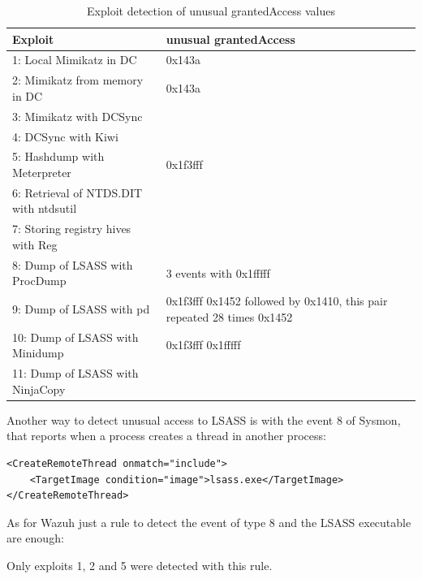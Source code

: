 \begin{table}[H]
	\begin{tabularx}{\textwidth}{|l|X|}
		\hline
		\rowcolor{gray!30}
		Exploit & unusual grantedAccess\\ \hline
		1: Local Mimikatz in DC& \cellcolor{green!60}0x143a\\ \hline
		2: Mimikatz from memory in DC& \cellcolor{green!60} 0x143a\\ \hline
		3: Mimikatz with DCSync& \cellcolor{red!60}\\ \hline
		4: DCSync with Kiwi& \cellcolor{red!60}\\ \hline
		5: Hashdump with Meterpreter& \cellcolor{green!60}0x1f3fff\\ \hline
		6: Retrieval of NTDS.DIT with ntdsutil& \cellcolor{red!60}\\ \hline
		7: Storing registry hives with Reg& \cellcolor{red!60}\\ \hline
		8: Dump of LSASS with ProcDump& \cellcolor{green!60}3 events with 0x1fffff\\ \hline
		9: Dump of LSASS with pd& \cellcolor{green!60}
			0x1f3fff \linej
			0x1452 followed by 0x1410, this pair repeated 28 times \linej
			0x1452 \\ \hline
		10: Dump of LSASS with Minidump& \cellcolor{green!60}
			0x1f3fff \linej
			0x1fffff \\ \hline
		11: Dump of LSASS with NinjaCopy& \cellcolor{red!60}\\ \hline
	\end{tabularx}
	\caption{Exploit detection of unusual grantedAccess values}
\end{table}
\linej
Another way to detect unusual access to LSASS is with the event 8 of Sysmon\cite{detection_events}, that reports when a process creates a thread in another process:
\begin{lstlisting}[style=xml]
<CreateRemoteThread onmatch="include">
	<TargetImage condition="image">lsass.exe</TargetImage>
</CreateRemoteThread>
\end{lstlisting}
\linej
As for Wazuh just a rule to detect the event of type 8 and the LSASS executable are enough:

\linej
Only exploits 1, 2 and 5 were detected with this rule.


